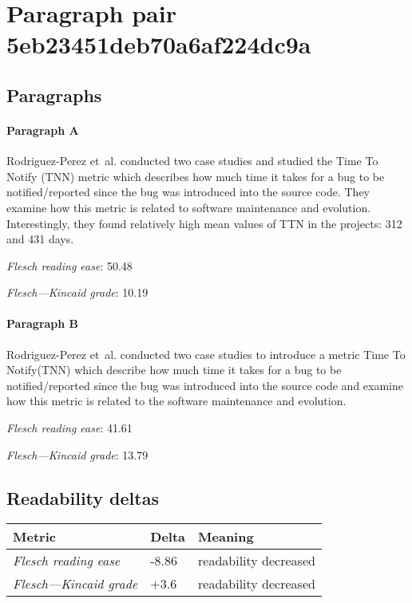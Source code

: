 \section{Paragraph pair 5eb23451deb70a6af224dc9a}
\subsection{Paragraphs}
\paragraph{Paragraph A}
Rodriguez-Perez et al. conducted two case studies and studied the Time To Notify (TNN) metric which describes how much time it takes for a bug to be notified/reported since the bug was introduced into the source code. They examine how this metric is related to software maintenance and evolution. Interestingly, they found relatively high mean values of TTN in the projects: 312 and 431 days.\par\medskip
\emph{Flesch reading ease}: 50.48\par
\emph{Flesch---Kincaid grade}: 10.19

\paragraph{Paragraph B}
Rodriguez-Perez et al. conducted two case studies to introduce a metric Time To Notify(TNN) which describe how much time it takes for a bug to be notified/reported since the bug was introduced into the source code and examine how this metric is related to the software maintenance and evolution.\par\medskip
\emph{Flesch reading ease}: 41.61\par
\emph{Flesch---Kincaid grade}: 13.79

\subsection{Readability deltas}

\begin{tabular}{lll}
\toprule
               \textbf{Metric} & \textbf{Delta} &       \textbf{Meaning} \\
\midrule
    \emph{Flesch reading ease} &          -8.86 &  readability decreased \\
 \emph{Flesch---Kincaid grade} &           +3.6 &  readability decreased \\
\bottomrule
\end{tabular}

